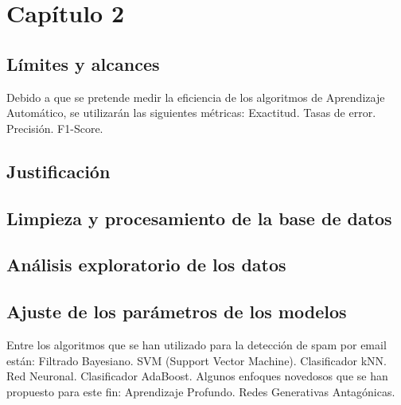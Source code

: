 \newpage

\begin{center}
\vspace*{15em}
{\huge\bfseries\color{blue}{Capítulo 2}\par}
{\huge\bfseries\color{blue}{El Abordaje del Problema}\par}
\end{center}
\chapter{Capítulo 2}
\section{Límites y alcances}
Debido a que se pretende medir la eficiencia de los algoritmos de Aprendizaje Automático, se utilizarán las siguientes métricas:
Exactitud.
Tasas de error.
Precisión.
F1-Score.
\section{Justificación}
\section{Limpieza y procesamiento de la base de datos}
\section{Análisis exploratorio de los datos}
\section{Ajuste de los parámetros de los modelos}
Entre los algoritmos que se han utilizado para la detección de spam por email están:
Filtrado Bayesiano.
SVM (Support Vector Machine).
Clasificador kNN.
Red Neuronal.
Clasificador AdaBoost.
Algunos enfoques novedosos que se han propuesto para este fin:
Aprendizaje Profundo.
Redes Generativas Antagónicas.

